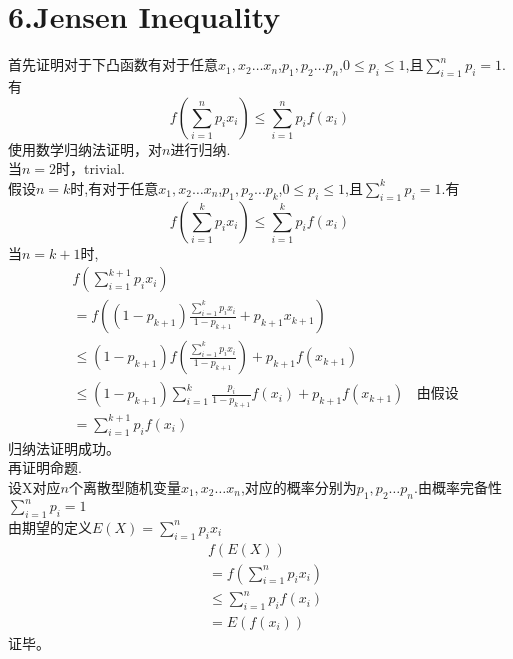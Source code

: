 \documentclass[a4paper,twocolumn]{ctexart}
\begin{document}
\section*{6.Jensen Inequality}
首先证明对于下凸函数有对于任意$x_1,x_2\ldots x_n$,$p_1,p_2\ldots p_n$,$0\le p_i\le1$,且$\sum_{i=1}^{n}p_i=1$.有\\
\[
f(\sum_{i=1}^{n}p_ix_i)\le \sum_{i=1}^{n}p_if(x_i)
\]
使用数学归纳法证明，对$n$进行归纳.\\
当$n=2$时，trivial.\\
假设$n=k$时,有对于任意$x_1,x_2\ldots x_n$,$p_1,p_2\ldots p_k$,$0\le p_i\le1$,且$\sum_{i=1}^{k}p_i=1$.有
\[
f(\sum_{i=1}^{k}p_ix_i)\le \sum_{i=1}^{k}p_if(x_i)
\]
当$n=k+1$时,
\begin{align*}
&f(\sum_{i=1}^{k+1}p_ix_i)\\
&=f\left(\left(1-p_{k+1}\right)\frac{\sum_{i=1}^{k}p_ix_i}{1-p_{k+1}}+p_{k+1}x_{k+1}\right)\\
&\le \left(1-p_{k+1}\right)f\left(\frac{\sum_{i=1}^{k}p_ix_i}{1-p_{k+1}}\right)+p_{k+1}f\left(x_{k+1}\right)\\
&\le(1-p_{k+1})\sum_{i=1}^{k}\frac{p_i}{1-p_{k+1}}f(x_i)+p_{k+1}f\left(x_{k+1}\right)~~~~\text{由假设}\\
&=\sum_{i=1}^{k+1}p_if\left(x_i\right)
\end{align*}
归纳法证明成功。\\
再证明命题.\\
设X对应$n$个离散型随机变量$x_1,x_2\ldots x_n$,对应的概率分别为$p_1,p_2\ldots p_n$.由概率完备性$\sum_{i=1}^{n}p_i=1$\\
由期望的定义$E(X)=\sum_{i=1}^{n}p_ix_i$
\begin{align*}
&f\left(E(X)\right)\\
&=f\left(\sum_{i=1}^{n}p_ix_i\right)\\
&\le \sum_{i=1}^{n}p_if\left(x_i\right)\\
&=E\left(f(x_i)\right)
\end{align*}
证毕。
\end{document}
